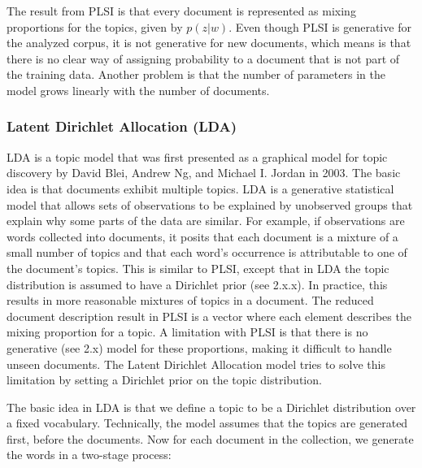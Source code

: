 \documentclass[12pt]{report}
\begin{document}
\vspace{3mm}
 
The result from PLSI is that every document is represented as mixing proportions for the topics, given by $p(z|w)$. Even though PLSI is generative for the analyzed corpus, it is not generative for new documents, which means is that there is no clear way of assigning probability to a document that is not part of the training data. Another problem is that the number of parameters in the model grows linearly with the number of documents.\par
 

\vspace{10mm}
\subsubsection{Latent Dirichlet Allocation (LDA)}
\vspace{5mm}

LDA is a topic model that was first presented as a graphical model for topic discovery by David Blei, Andrew Ng, and Michael I. Jordan in 2003. The basic idea is that documents exhibit multiple topics. LDA is a generative statistical model that allows sets of observations to be explained by unobserved groups that explain why some parts of the data are similar. For example, if observations are words collected into documents, it posits that each document is a mixture of a small number of topics and that each word's occurrence is attributable to one of the document's topics. This is similar to PLSI, except that in LDA the topic distribution is assumed to have a Dirichlet prior (see 2.x.x). In practice, this results in more reasonable mixtures of topics in a document. The reduced document description result in PLSI is a vector where each element describes the mixing proportion for a topic. A limitation with PLSI is that there is no generative (see 2.x) model for these proportions, making it difficult to handle unseen documents. The Latent Dirichlet Allocation model tries to solve this limitation by setting a Dirichlet prior on the topic distribution.\par

\vspace{3mm}

The basic idea in LDA is that  we define a topic to be a Dirichlet distribution over a fixed vocabulary. Technically, the model assumes that the topics are generated first, before the documents. Now for each document in the collection, we generate the words in a two-stage process:
\end{document}
